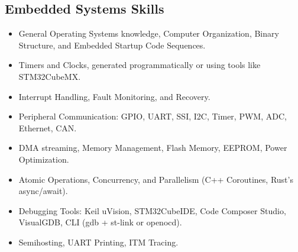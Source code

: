 \documentclass{article}
\begin{document}
\subsection*{Embedded Systems Skills}
\begin{itemize}
    \item General Operating Systems knowledge, Computer Organization, Binary Structure, and Embedded Startup Code Sequences.
    \item Timers and Clocks, generated programmatically or using tools like STM32CubeMX.
    \item Interrupt Handling, Fault Monitoring, and Recovery.
    \item Peripheral Communication: GPIO, UART, SSI, I2C, Timer, PWM, ADC, Ethernet, CAN.
    \item DMA streaming, Memory Management, Flash Memory, EEPROM, Power Optimization.
    \item Atomic Operations, Concurrency, and Parallelism (C++ Coroutines, Rust’s async/await).
    \item Debugging Tools: Keil uVision, STM32CubeIDE, Code Composer Studio, VisualGDB, CLI (gdb + st-link or openocd).
    \item Semihosting, UART Printing, ITM Tracing.
\end{itemize}
\end{document}
